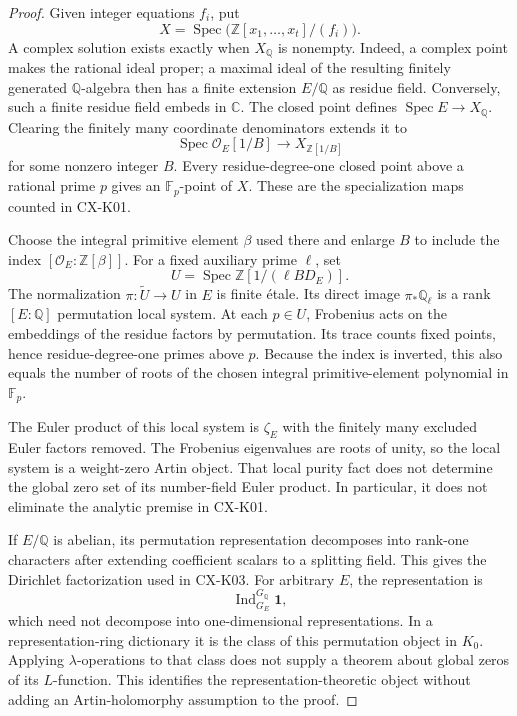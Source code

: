 \begin{proof}
Given integer equations $f_i$, put
\[
 X=\operatorname{Spec}\bigl(\mathbb Z[x_1,\ldots,x_t]/(f_i)\bigr).
\]
A complex solution exists exactly when $X_{\mathbb Q}$ is nonempty.
Indeed, a complex point makes the rational ideal proper; a maximal
ideal of the resulting finitely generated $\mathbb Q$-algebra then
has a finite extension $E/\mathbb Q$ as residue field. Conversely,
such a finite residue field embeds in $\mathbb C$. The closed point
defines $\operatorname{Spec}E\to X_{\mathbb Q}$. Clearing the finitely
many coordinate denominators extends it to
\[
 \operatorname{Spec}\mathcal O_E[1/B]
     \longrightarrow X_{\mathbb Z[1/B]}
\]
for some nonzero integer $B$. Every residue-degree-one closed point
above a rational prime $p$ gives an $\mathbb F_p$-point of $X$.
These are the specialization maps counted in CX-K01.

Choose the integral primitive element $\beta$ used there and enlarge
$B$ to include the index $[\mathcal O_E:\mathbb Z[\beta]]$.
For a fixed auxiliary prime $\ell$, set
\[
 U=\operatorname{Spec}\mathbb Z[1/(\ell B D_E)].
\]
The normalization $\pi:\widetilde U\to U$ in $E$ is finite
\'etale. Its direct image $\pi_*\mathbb Q_\ell$ is a rank
$[E:\mathbb Q]$ permutation local system. At each $p\in U$,
Frobenius acts on the embeddings of the residue factors by
permutation. Its trace counts fixed points, hence residue-degree-one
primes above $p$. Because the index is inverted, this also equals the
number of roots of the chosen integral primitive-element polynomial
in $\mathbb F_p$.

The Euler product of this local system is $\zeta_E$ with the finitely
many excluded Euler factors removed. The Frobenius eigenvalues are
roots of unity, so the local system is a weight-zero Artin object.
That local purity fact does not determine the global zero set of its
number-field Euler product. In particular, it does not eliminate the
analytic premise in CX-K01.

If $E/\mathbb Q$ is abelian, its permutation representation decomposes
into rank-one characters after extending coefficient scalars to a
splitting field. This gives the Dirichlet factorization used in
CX-K03. For arbitrary $E$, the representation is
\[
 \operatorname{Ind}_{G_E}^{G_{\mathbb Q}}\mathbf1,
\]
which need not decompose into one-dimensional representations.
In a representation-ring dictionary it is the class of this
permutation object in $K_0$. Applying $\lambda$-operations to that
class does not supply a theorem about global zeros of its $L$-function.
This identifies the representation-theoretic object without adding
an Artin-holomorphy assumption to the proof.


\end{proof}
